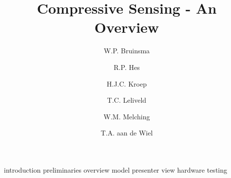 \documentclass[a4paper, openany, oneside]{memoir}
\title{Compressive Sensing - An Overview}
\author{W.P. Bruinsma \and R.P. Hes \and H.J.C. Kroep \and T.C. Leliveld \and W.M. Melching \and T.A. aan de Wiel}
\begin{document}
{introduction}
{preliminaries}
{overview}
{model}
{presenter}
{view}
{hardware}
{testing}
\end{document}
